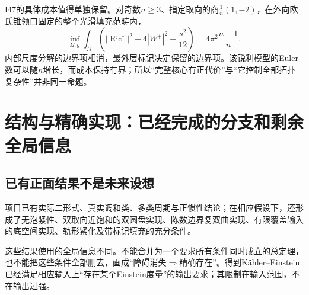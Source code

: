 \documentclass[UTF8,fontset=fandol,zihao=-4,a4paper]{ctexart}
\theoremstyle{remark}
\DeclareMathOperator{\Ric}{Ric}
\begin{document}
I47的具体成本值得单独保留。对奇数$n\ge3$、指定取向的商$\frac1n(1,-2)$，在外向欧氏锥领口固定的整个光滑填充范畴内，
\[
\inf_{\Omega,g}\int_\Omega
\left(|\Ric^\circ|^2+4|W^+|^2+\frac{s^2}{12}\right)
=4\pi^2\frac{n-1}{n}.
\]
内部尺度分解的边界项相消，最外层标记决定保留的边界项。该锐利模型的Euler数可以随$n$增长，而成本保持有界；所以“完整核心有正代价”与“它控制全部拓扑复杂性”并非同一命题。

\section{结构与精确实现：已经完成的分支和剩余全局信息}

\subsection{已有正面结果不是未来设想}

项目已有实际二形式、真实调和类、多类周期与正惯性结论；在相应假设下，还形成了无泡紧性、双取向近饱和的双圆盘实现、陈数边界复双曲实现、有限覆盖输入的底空间实现、轨形紧化及带标记填充的充分条件。

这些结果使用的全局信息不同。不能合并为一个要求所有条件同时成立的总定理，也不能把这些条件全部删去，画成“障碍消失$\Rightarrow$精确存在”。得到Kähler--Einstein已经满足相应输入上“存在某个Einstein度量”的输出要求；其限制在输入范围，不在输出过强。
\end{document}
